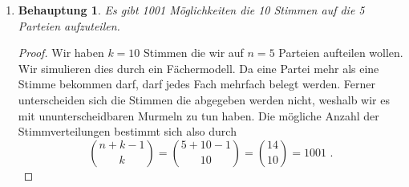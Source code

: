 \documentclass[a4paper]{scrartcl}
\newtheorem*{behaupt}{Behauptung}
\begin{document}
\begin{enumerate}[label=\bfseries\arabic*.]
    \item
        \begin{behaupt}
            Es gibt 1001 Möglichkeiten die 10 Stimmen auf die 5 Parteien aufzuteilen.
        \end{behaupt}
        \begin{proof}
            Wir haben $k = 10$ Stimmen die wir auf $n = 5$ Parteien aufteilen
            wollen.
            Wir simulieren dies durch ein Fächermodell.
            Da eine Partei mehr als eine Stimme bekommen darf, darf jedes Fach
            mehrfach belegt werden.
            Ferner unterscheiden sich die Stimmen die abgegeben werden nicht,
            weshalb wir es mit ununterscheidbaren Murmeln zu tun haben.
            Die mögliche Anzahl der Stimmverteilungen bestimmt sich also durch
            \begin{equation}
                \binom{n+k-1}{k} = \binom{5+10-1}{10} = \binom{14}{10} = 1001
                \text{ .}
            \end{equation}
        \end{proof}

    

\end{enumerate}
\end{document}

